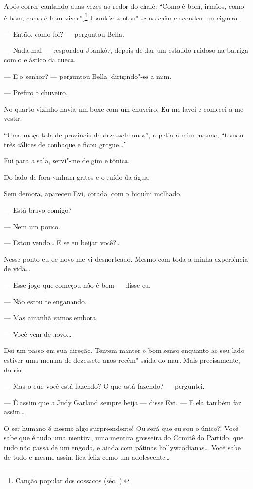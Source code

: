 Após correr cantando duas vezes ao redor do chalé: ``Como é bom, irmãos,
como é bom, como é bom viver'',\footnote{Canção popular dos cossacos
  (séc. ).} Jbankóv sentou"-se no chão e acendeu um cigarro.

--- Então, como foi? --- perguntou Bella.

--- Nada mal --- respondeu Jbankóv, depois de dar um
estalido ruidoso na barriga com o elástico da cueca.

--- E o senhor? --- perguntou Bella, dirigindo"-se a mim.

--- Prefiro o chuveiro.

No quarto vizinho havia um boxe com um chuveiro. Eu me lavei e comecei a
me vestir.

``Uma moça tola de província de dezessete anos'', repetia a mim mesmo,
``tomou três cálices de conhaque e ficou grogue\ldots{}''

Fui para a sala, servi"-me de gim e tônica.

Do lado de fora vinham gritos e o ruído da água.

Sem demora, apareceu Evi, corada, com o biquíni molhado.

--- Está bravo comigo?

--- Nem um pouco.

--- Estou vendo\ldots{} E se eu beijar você?\ldots{}

Nesse ponto eu de novo me vi desnorteado. Mesmo com toda a minha
experiência de vida\ldots{}

--- Esse jogo que começou não é bom --- disse eu.

--- Não estou te enganando.

--- Mas amanhã vamos embora.

--- Você vem de novo\ldots{}

Dei um passo em sua direção. Tentem manter o bom senso enquanto ao seu
lado estiver uma menina de dezessete anos recém"-saída do mar. Mais
precisamente, do rio\ldots{}

--- Mas o que você está fazendo? O que está fazendo? ---
perguntei.

--- É assim que a Judy Garland sempre beija --- disse Evi.
--- E ela também faz assim\ldots{}

O ser humano é mesmo algo surpreendente! Ou será que eu sou o único?!
Você sabe que é tudo uma mentira, uma mentira grosseira do Comitê do
Partido, que tudo não passa de um engodo, e ainda com pátinas
hollywoodianas\ldots{} Você sabe de tudo e mesmo assim fica feliz como um
adolescente\ldots{}


